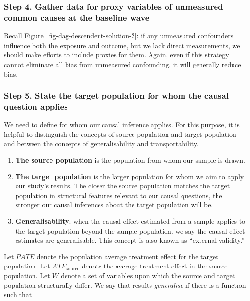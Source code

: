 \documentclass[
  singlecolumn]{article}
\begin{document}
\hypertarget{step-4.-gather-data-for-proxy-variables-of-unmeasured-common-causes-at-the-baseline-wave}{%
\subsubsection{Step 4. Gather data for proxy variables of unmeasured
common causes at the baseline
wave}\label{step-4.-gather-data-for-proxy-variables-of-unmeasured-common-causes-at-the-baseline-wave}}

Recall Figure~\ref{fig-dag-descendent-solution-2}: if any unmeasured
confounders influence both the exposure and outcome, but we lack direct
measurements, we should make efforts to include proxies for them. Again,
even if this strategy cannot eliminate all bias from unmeasured
confounding, it will generally reduce bias.

\hypertarget{step-5.-state-the-target-population-for-whom-the-causal-question-applies}{%
\subsubsection{Step 5. State the target population for whom the causal
question
applies}\label{step-5.-state-the-target-population-for-whom-the-causal-question-applies}}

We need to define for whom our causal inference applies. For this
purpose, it is helpful to distinguish the concepts of source population
and target population and between the concepts of generalisability and
transportability.

\begin{enumerate}
\def\labelenumi{\arabic{enumi}.}
\item
  \textbf{The source population} is the population from whom our sample
  is drawn.
\item
  \textbf{The target population} is the larger population for whom we
  aim to apply our study's results. The closer the source population
  matches the target population in structural features relevant to our
  causal questions, the stronger our causal inferences about the target
  population will be.
\item
  \textbf{Generalisability}: when the causal effect estimated from a
  sample applies to the target population beyond the sample population,
  we say the causal effect estimates are generalisable. This concept is
  also known as ``external validity.''
\end{enumerate}

Let \(PATE\) denote the population average treatment effect for the
target population. Let \(ATE_{\text{source}}\) denote the average
treatment effect in the source population. Let \(W\) denote a set of
variables upon which the source and target population structurally
differ. We say that results \emph{generalise} if there is a function
such that
\end{document}
